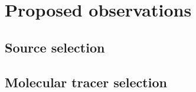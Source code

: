 \section{Proposed observations}
\subsection{Source selection}
\subsection{Molecular tracer selection}
  